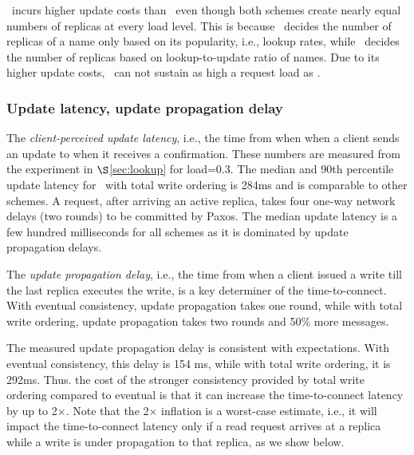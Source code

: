 \codons\  incurs higher update costs than \auspice\   even though both schemes create nearly equal numbers of replicas at every load level. This is because \codons\ decides the number of replicas of a name only based on its popularity, i.e., lookup rates, while \auspice\ decides the number of replicas based on lookup-to-update ratio of names. Due to its higher update costs, \codons\  can not sustain as high a request load as \auspice.

\vsp
\subsubsection{Update latency, update propagation delay}
\label{sec:updatelatency}




The {\em client-perceived update latency}, i.e., the time from when when a client sends an update to when it receives a confirmation. %
These numbers are measured from the experiment in $\S$\ref{sec:lookup} for load=0.3. The median and 90th percentile update latency for \auspice\ with total write ordering is 284ms and is comparable to other schemes. A request, after arriving an active replica, takes four one-way network delays (two rounds) to be committed by Paxos. The median update latency is a few hundred milliseconds for all schemes as it is dominated by update propagation delays.

The {\em update propagation delay}, i.e., the time from when a client issued a write till the last replica executes the write, is a key determiner of the time-to-connect. With eventual consistency, update propagation takes one round, while with total write ordering, update propagation takes two rounds and 50\% more messages.

The measured update propagation delay is consistent with expectations. With eventual consistency, this delay is 154 ms, while with total write ordering, it is 292ms. Thus. the cost of the stronger consistency provided by total write ordering compared to eventual is that it can increase the time-to-connect latency by up to 2$\times$. Note that the 2$\times$ inflation is a worst-case estimate, i.e., it will impact the time-to-connect latency only if a read request arrives at a replica while a write is under propagation to that replica, as we show below.






